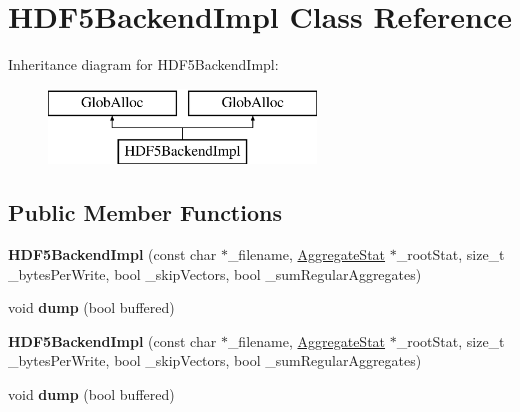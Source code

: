 \hypertarget{classHDF5BackendImpl}{\section{H\-D\-F5\-Backend\-Impl Class Reference}
\label{classHDF5BackendImpl}
}
Inheritance diagram for H\-D\-F5\-Backend\-Impl\-:\begin{figure}[H]
\begin{center}
\leavevmode
\includegraphics[height=2.000000cm]{classHDF5BackendImpl}
\end{center}
\end{figure}
\subsection*{Public Member Functions}
\begin{DoxyCompactItemize}
\item 
\hypertarget{classHDF5BackendImpl_a43a2ce26bf80e7bf7f8153fb9363c34c}{{\bfseries H\-D\-F5\-Backend\-Impl} (const char $\ast$\-\_\-filename, \hyperlink{classAggregateStat}{Aggregate\-Stat} $\ast$\-\_\-root\-Stat, size\-\_\-t \-\_\-bytes\-Per\-Write, bool \-\_\-skip\-Vectors, bool \-\_\-sum\-Regular\-Aggregates)}\label{classHDF5BackendImpl_a43a2ce26bf80e7bf7f8153fb9363c34c}

\item 
\hypertarget{classHDF5BackendImpl_a8d892e64826c093bcd9e456278f3422e}{void {\bfseries dump} (bool buffered)}\label{classHDF5BackendImpl_a8d892e64826c093bcd9e456278f3422e}

\item 
\hypertarget{classHDF5BackendImpl_a43a2ce26bf80e7bf7f8153fb9363c34c}{{\bfseries H\-D\-F5\-Backend\-Impl} (const char $\ast$\-\_\-filename, \hyperlink{classAggregateStat}{Aggregate\-Stat} $\ast$\-\_\-root\-Stat, size\-\_\-t \-\_\-bytes\-Per\-Write, bool \-\_\-skip\-Vectors, bool \-\_\-sum\-Regular\-Aggregates)}\label{classHDF5BackendImpl_a43a2ce26bf80e7bf7f8153fb9363c34c}

\item 
\hypertarget{classHDF5BackendImpl_a8d892e64826c093bcd9e456278f3422e}{void {\bfseries dump} (bool buffered)}\label{classHDF5BackendImpl_a8d892e64826c093bcd9e456278f3422e}

\end{DoxyCompactItemize}


